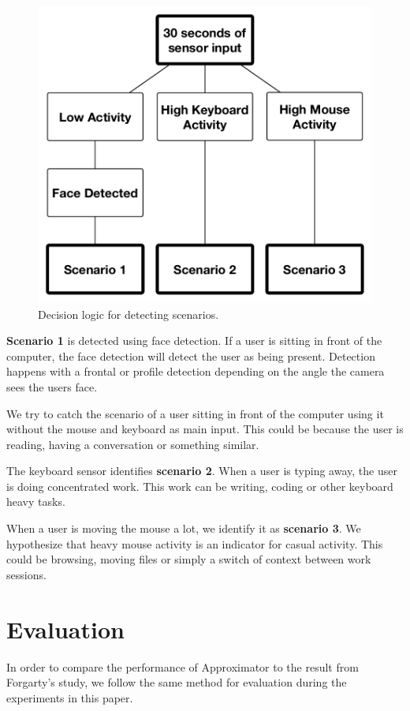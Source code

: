 \documentclass{sigchi}
\begin{document}
\begin{figure}[H]
  \centering
  \includegraphics[width=\columnwidth]{figures/decision_logic.pdf}
  \caption{Decision logic for detecting scenarios.}
  \label{fig:decision_logic}
\end{figure}

\textbf{Scenario 1} is detected using face detection.
If a user is sitting in front of the computer, the face detection will detect the user as being present.
Detection happens with a frontal or profile detection depending on the angle the camera sees the users face.

We try to catch the scenario of a user sitting in front of the computer using it without the mouse and keyboard as main input.
This could be because the user is reading, having a conversation or something similar.

The keyboard sensor identifies \textbf{scenario 2}.
When a user is typing away, the user is doing concentrated work.
This work can be writing, coding or other keyboard heavy tasks.

When a user is moving the mouse a lot, we identify it as \textbf{scenario 3}.
We hypothesize that heavy mouse activity is an indicator for casual activity.
This could be browsing, moving files or simply a switch of context between work sessions.


\section{Evaluation}
In order to compare the performance of Approximator to the result from Forgarty's study, we follow the same method for evaluation during the experiments in this paper.
\end{document}
